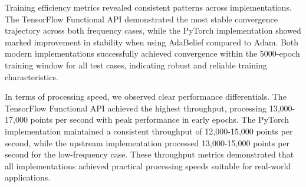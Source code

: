 \documentclass[10pt,journal,compsoc,onecolumn]{IEEEtran}
\begin{document}
Training efficiency metrics revealed consistent patterns across implementations. The TensorFlow Functional API demonstrated the most stable convergence trajectory across both frequency cases, while the PyTorch implementation showed marked improvement in stability when using AdaBelief compared to Adam. Both modern implementations successfully achieved convergence within the 5000-epoch training window for all test cases, indicating robust and reliable training characteristics.

In terms of processing speed, we observed clear performance differentials. The TensorFlow Functional API achieved the highest throughput, processing 13,000-17,000 points per second with peak performance in early epochs. The PyTorch implementation maintained a consistent throughput of 12,000-15,000 points per second, while the upstream implementation processed 13,000-15,000 points per second for the low-frequency case. These throughput metrics demonstrated that all implementations achieved practical processing speeds suitable for real-world applications.
\end{document}
